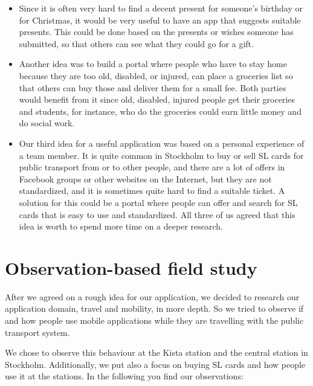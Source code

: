 \documentclass[11pt,twoside,a4paper]{report}
\begin{document}
\begin{itemize}
	\item Since it is often very hard to find a decent present for someone's birthday or for Christmas, it would be very useful to have an app that suggests suitable presents. This could be done based on the presents or wishes someone has submitted, so that others can see what they could go for a gift.
	\item Another idea was to build a portal where people who have to stay home because they are too old, disabled, or injured, can place a groceries list so that others can buy those and deliver them for a small fee. Both parties would benefit from it since old, disabled, injured people get their groceries and students, for instance, who do the groceries could earn little money and do social work.
	\item Our third idea for a useful application was based on a personal experience of a team member. It is quite common in Stockholm to buy or sell SL cards for public transport from or to other people, and there are a lot of offers in Facebook groups or other websites on the Internet, but they are not standardized, and it is sometimes quite hard to find a suitable ticket. A solution for this could be a portal where people can offer and search for SL cards that is easy to use and standardized. All three of us agreed that this idea is worth to spend more time on a deeper research.
\end{itemize}

\section{Observation-based field study}

After we agreed on a rough idea for our application, we decided to research our application domain, travel and mobility, in more depth. So we tried to observe if and how people use mobile applications while they are travelling with the public transport system.

We chose to observe this behaviour at the Kista station and the central station in Stockholm. Additionally, we put also a focus on buying SL cards and how people use it at the stations. In the following you find our observations:
\end{document}
